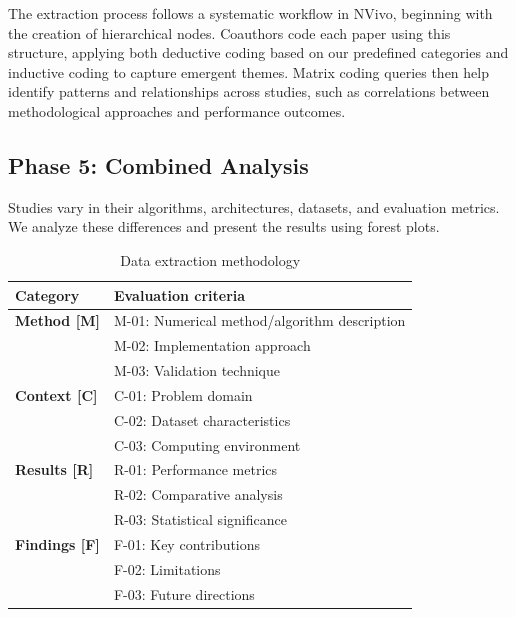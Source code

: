 \documentclass[acmsmall]{acmart}
\begin{document}
The extraction process follows a systematic workflow in NVivo, beginning with the creation of hierarchical nodes. Coauthors code each paper using this structure, applying both deductive coding based on our predefined categories and inductive coding to capture emergent themes. Matrix coding queries then help identify patterns and relationships across studies, such as correlations between methodological approaches and performance outcomes.

\subsection{Phase 5: Combined Analysis}\label{subsec:phase-5-combined-analysis}
Studies vary in their algorithms, architectures, datasets, and evaluation metrics. We analyze these differences and present the results using forest plots.

\begin{table}[ht]
    \centering
    \caption{Data extraction methodology}
    \label{tab:eval_framework}
    \begin{tabular}{>{\bfseries}ll}
        \toprule
        \textbf{Category} & \textbf{Evaluation criteria}                 \\
        \midrule
        Method [M]        & M-01: Numerical method/algorithm description \\
                          & M-02: Implementation approach                \\
                          & M-03: Validation technique                   \\
        \addlinespace
        Context [C]       & C-01: Problem domain                         \\
                          & C-02: Dataset characteristics                \\
                          & C-03: Computing environment                  \\
        \addlinespace
        Results [R]       & R-01: Performance metrics                    \\
                          & R-02: Comparative analysis                   \\
                          & R-03: Statistical significance               \\
        \addlinespace
        Findings [F]      & F-01: Key contributions                      \\
                          & F-02: Limitations                            \\
                          & F-03: Future directions                      \\
        \bottomrule
    \end{tabular}
\end{table}
\end{document}
